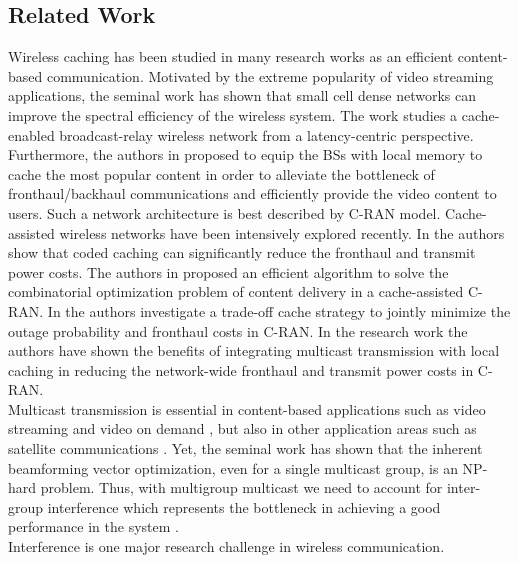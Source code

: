 \documentclass[12pt,draftcls,onecolumn]{IEEEtran}
\theoremstyle{remark}
\theoremstyle{definition}
\begin{document}
\subsection{Related Work}
Wireless caching has been studied in many research works as an efficient content-based communication. Motivated by the extreme popularity of video streaming applications, the seminal work \cite{6600983} has shown that small cell dense networks can improve the spectral efficiency of the wireless system. The work \cite{8732315} studies a cache-enabled broadcast-relay wireless network from a latency-centric perspective. Furthermore, the authors in \cite{6600983} proposed to equip the BSs with local memory to cache the most popular content in order to alleviate the bottleneck of fronthaul/backhaul communications and efficiently provide the video content to users. Such a network architecture is best described by C-RAN model. Cache-assisted wireless networks have been intensively explored recently. In \cite{7499119} the authors show that coded caching can significantly reduce the fronthaul and transmit power costs. The authors in \cite{7925639} proposed an efficient algorithm to solve the combinatorial optimization problem of content delivery in a cache-assisted C-RAN. In \cite{8269405} the authors investigate a trade-off cache strategy to jointly minimize the outage probability and fronthaul costs in C-RAN. In the research work \cite{7488289} the authors have shown the benefits of integrating  multicast transmission with local caching in reducing the network-wide fronthaul and transmit power costs in C-RAN. \\
\indent Multicast transmission is essential in content-based applications such as video streaming and video on demand \cite{7537173}, but also in other application areas such as satellite communications \cite{7091022,7765141}. Yet, the seminal work \cite{1634819} has shown that the inherent beamforming vector optimization, even for a single multicast group, is an NP-hard problem. Thus, with multigroup multicast we need to account for inter-group interference which represents the bottleneck in achieving a good performance in the system \cite{8019852}. \\ \indent
Interference is one major research challenge in wireless communication. %
\end{document}
